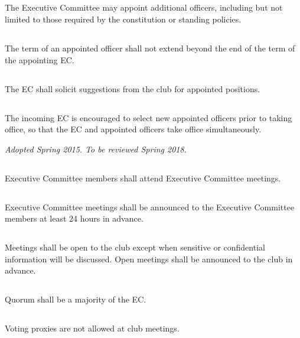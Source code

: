 \documentclass{bylaws}
\newcommand{\sptimes}[2]{\emph{Adopted #1. To be reviewed #2.}}
\begin{document}

\subsection{}The Executive Committee may appoint additional officers, including but not limited to those required by the constitution or standing policies.
\subsection{}The term of an appointed officer shall not extend beyond the end of the term of the appointing EC.
\subsection{}The EC shall solicit suggestions from the club for appointed positions.
\subsection{}The incoming EC is encouraged to select new appointed officers prior to taking office, so that the EC and appointed officers take office simultaneously.


\sptimes{Spring 2015}{Spring 2018}


\subsection{}Executive Committee members shall attend Executive Committee meetings.
\subsection{}Executive Committee meetings shall be announced to the Executive Committee members at least 24 hours in advance.
\subsection{}Meetings shall be open to the club except when sensitive or confidential information will be discussed. Open meetings shall be announced to the club in advance.
\subsection{}Quorum shall be a majority of the EC.

\subsection{}Voting proxies are not allowed at club meetings.
\end{document}
